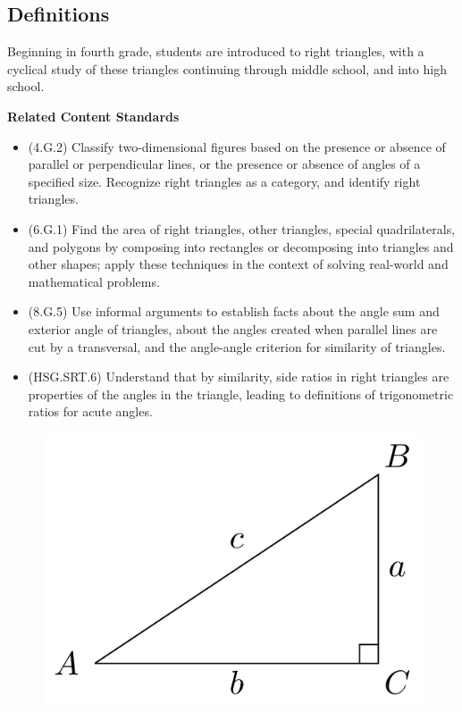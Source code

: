 \documentclass[
]{book}
\providecommand{\tightlist}{%
  \setlength{\itemsep}{0pt}\setlength{\parskip}{0pt}}
\newenvironment{standards}{}{}
\theoremstyle{definition}
\theoremstyle{definition}
\theoremstyle{definition}
\theoremstyle{definition}
\theoremstyle{remark}
\begin{document}
\hypertarget{definitions}{%
\subsection{Definitions}\label{definitions}}

Beginning in fourth grade, students are introduced to right triangles, with a cyclical study of these triangles continuing through middle school, and into high school.

\begin{standards}

\begin{center}
\textbf{Related Content Standards}

\end{center}

\begin{itemize}
\tightlist
\item
  (4.G.2) Classify two-dimensional figures based on the presence or absence of parallel or perpendicular lines, or the presence or absence of angles of a specified size. Recognize right triangles as a category, and identify right triangles.
\item
  (6.G.1) Find the area of right triangles, other triangles, special quadrilaterals, and polygons by composing into rectangles or decomposing into triangles and other shapes; apply these techniques in the context of solving real-world and mathematical problems.
\item
  (8.G.5) Use informal arguments to establish facts about the angle sum and exterior angle of triangles, about the angles created when parallel lines are cut by a transversal, and the angle-angle criterion for similarity of triangles.
\item
  (HSG.SRT.6) Understand that by similarity, side ratios in right triangles are properties of the angles in the triangle, leading to definitions of trigonometric ratios for acute angles.
\end{itemize}

\end{standards}

\begin{figure}

{\centering \includegraphics[width=0.3\linewidth]{tikz/right-triangle-trig} 

}

\end{figure}
\end{document}
